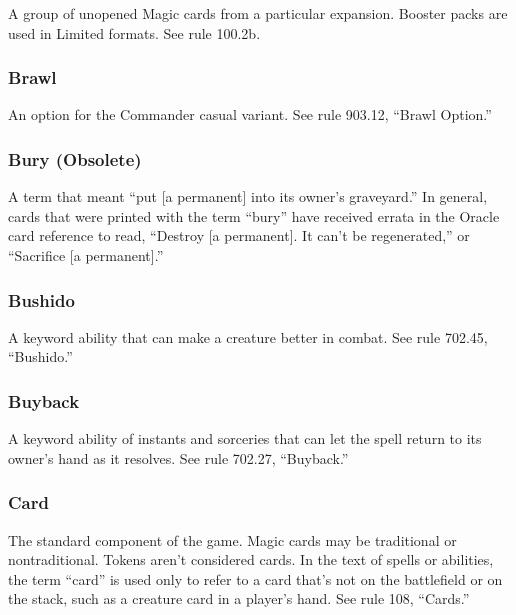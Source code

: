 {{{A group of unopened Magic cards from a particular expansion. Booster packs are used in Limited formats. See rule 100.2b.

\subsubsection*{Brawl}

An option for the Commander casual variant. See rule 903.12, “Brawl Option.”

\subsubsection*{Bury (Obsolete)}

A term that meant “put [a permanent] into its owner’s graveyard.” In general, cards that were printed with the term “bury” have received errata in the Oracle card reference to read, “Destroy [a permanent]. It can’t be regenerated,” or “Sacrifice [a permanent].”

\subsubsection*{Bushido}

A keyword ability that can make a creature better in combat. See rule 702.45, “Bushido.”

\subsubsection*{Buyback}

A keyword ability of instants and sorceries that can let the spell return to its owner’s hand as it resolves. See rule 702.27, “Buyback.”

\subsubsection*{Card}

The standard component of the game. Magic cards may be traditional or nontraditional. Tokens aren’t considered cards. In the text of spells or abilities, the term “card” is used only to refer to a card that’s not on the battlefield or on the stack, such as a creature card in a player’s hand. See rule 108, “Cards.”

}}}
